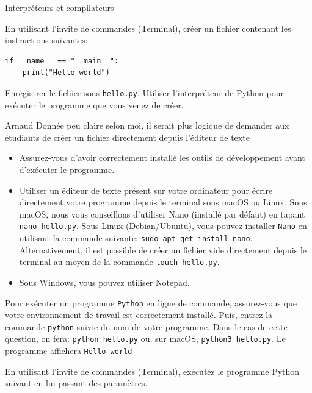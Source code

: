 \begin{section}{Interpréteurs et compilateurs}
\begin{Exercice}[10 minutes]
        En utilisant l'invite de commandes (Terminal), créer un fichier contenant les instructions suivantes:
        \begin{lstlisting}
if __name__ == "__main__":
    print("Hello world")
        \end{lstlisting}
        Enregistrer le fichier sous \lstinline{hello.py}. Utiliser l'interpréteur de Python pour exécuter le programme que vous venez de créer.
    \end{Exercice}
    \begin{note}{Arnaud}
    Donnée peu claire selon moi, il serait plus logique de demander aux étudiants de créer un fichier directement depuis l'éditeur de texte
    \end{note}
    \begin{conseil}
        \begin{itemize}
            \item Assurez-vous d'avoir correctement installé les outils de développement avant d'exécuter le programme.
            \item Utiliser un éditeur de texte présent sur votre ordinateur pour écrire directement votre programme depuis le terminal sous macOS ou Linux. Sous macOS, nous vous conseillons d'utiliser Nano (installé par défaut) en tapant \lstinline{nano hello.py}. Sous Linux (Debian/Ubuntu), vous pouvez installer \lstinline{Nano} en utilisant la commande suivante: \lstinline{sudo apt-get install nano}.
Alternativement, il est possible de créer un fichier vide directement depuis le terminal au moyen de la commande \lstinline{touch hello.py}.
            \item Sous Windows, vous pouvez utiliser Notepad. 
        \end{itemize}
    \end{conseil}
    \begin{solution}
        Pour exécuter un programme \lstinline{Python} en ligne de commande, assurez-vous que votre environnement de travail est correctement installé. Puis, entrez la commande \lstinline{python} suivie du nom de votre programme. 
        Dans le cas de cette question, on fera: \lstinline{python hello.py} ou, sur macOS, \lstinline{python3 hello.py}.
        Le programme affichera \lstinline{Hello world}
    \end{solution}
    

    \begin{Exercice}[10 minutes]
        En utilisant l'invite de commandes (Terminal), exécutez le programme Python suivant en lui passant des paramètres.


\end{Exercice}
\end{section}
